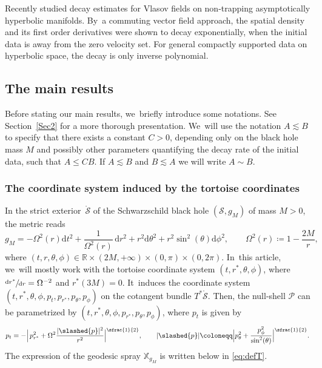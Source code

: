 \documentclass[10pt]{amsart}
\theoremstyle{plain}
\theoremstyle{definition}
\newcommand\R{{\mathbb{R}}}
\newcommand\T{{\mathbb{X}}}
\newcommand\dr{{\mathrm{d}}}
\begin{document}
Recently \cite{VVel23} studied decay estimates for Vlasov fields on non-trapping asymptotically hyperbolic manifolds. By~a commuting vector field approach, the spatial density and its first order derivatives were shown to decay exponentially, when the initial data is away from the zero velocity set. For general compactly supported data on hyperbolic space, the decay is only inverse polynomial.

\subsection{The main results}

Before stating our main results, we~briefly introduce some notations. See Section~\ref{Sec2} for a more thorough presentation. We~will use the notation $A \lesssim B$ to specify that there exists a constant $C>0$, depending only on the black hole mass $M$ and possibly other parameters quantifying the decay rate of the initial data, such that $A \leq CB$. If $A \lesssim B $ and $B \lesssim A$ we will write $A \sim B$.

\subsubsection{The coordinate system induced by the tortoise coordinates}

In the strict exterior~$\mathring{\mathcal{S}}$ of the Schwarzschild black hole $(\mathcal{S},g_M)$ of mass $M>0$, the metric reads
\[
g_M=-\Omega^2(r)\dr t^2+\frac{1}{\Omega^2(r)}\,\dr r^2+r^2 \dr \theta^2+r^2\sin^2(\theta) \dr \phi^2, \qquad \Omega^2(r)\coloneqq1-\frac{2M}{r},
\]
where $(t,r,\theta, \phi) \in \R \times (2M,+ \infty) \times (0,\pi) \times (0,2 \pi)$. In~this article, we~will mostly work with the tortoise coordinate system $(t,r^*,\theta, \phi)$, where $\sfrac{\dr r^*}{\dr r}=\Omega^{-2}$ and $r^*(3M)=0$. It~induces the coordinate system $(t,r^*,\theta,\phi,p_t,p_{r^*},p_{\theta}, p_{\phi})$ on the cotangent bundle $T^* \mathring{\mathcal{S}}$. Then, the null-shell $\mathcal{P}$ can be parametrized by $(t,r^*,\theta,\phi,p_{r^*},p_{\theta}, p_{\phi})$, where $p_t$ is given by
\begin{equation*}
p_t = - \Bigl| \,p_{r^*}^2 + \Omega^2 \frac{|\slashed{p}|^2}{r^2} \Bigr|^{\sfrac{1}{2}},\qquad |\slashed{p}| \coloneqq \Bigl|p_{\theta}^2+\frac{ p_{\phi}^2}{\sin^2 (\theta) }\Bigr|^{\sfrac{1}{2}}.
\end{equation*}
The expression of the geodesic spray $\T_{g_M}$ is written below in \eqref{eq:defT}.
\end{document}
